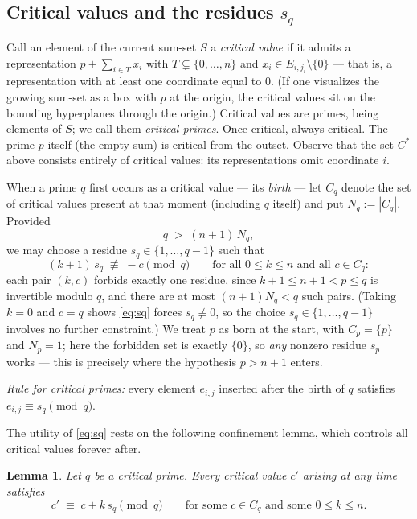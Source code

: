 \documentclass[11pt]{amsart}
\newtheorem{lemma}[theorem]{Lemma}
\theoremstyle{remark}
\begin{document}
\subsection*{Critical values and the residues $s_q$}

Call an element of the current sum-set $S$ a \emph{critical value} if
it admits a representation $p+\sum_{i\in T}x_i$ with
$T\subsetneq\{0,\dots,n\}$ and $x_i\in E_{i,j_i}\setminus\{0\}$ ---
that is, a representation with at least one coordinate equal to $0$.
(If one visualizes the growing sum-set as a box with $p$ at the
origin, the critical values sit on the bounding hyperplanes through
the origin.)  Critical values are primes, being elements of $S$; we
call them \emph{critical primes}.  Once critical, always critical.
The prime $p$ itself (the empty sum) is critical from the outset.
Observe that the set $C^\ast$ above consists entirely of critical
values: its representations omit coordinate $i$.

When a prime $q$ first occurs as a critical value --- its
\emph{birth} --- let $C_q$ denote the set of critical values present
at that moment (including $q$ itself) and put $N_q:=|C_q|$.  Provided
\begin{equation}\label{eq:room}
q \;>\; (n+1)\,N_q ,
\end{equation}
we may choose a residue $s_q\in\{1,\dots,q-1\}$ such that
\begin{equation}\label{eq:sq}
(k+1)\,s_q \;\not\equiv\; -c \pmod q
\qquad\text{for all } 0\le k\le n \text{ and all } c\in C_q :
\end{equation}
each pair $(k,c)$ forbids exactly one residue, since
$k+1\le n+1<p\le q$ is invertible modulo $q$, and there are at most
$(n+1)N_q<q$ such pairs.  (Taking $k=0$ and $c=q$ shows
\eqref{eq:sq} forces $s_q\not\equiv 0$, so the choice
$s_q\in\{1,\dots,q-1\}$ involves no further constraint.)  We treat $p$
as born at the start, with $C_p=\{p\}$ and $N_p=1$; here the forbidden
set is exactly $\{0\}$, so \emph{any} nonzero residue $s_p$ works ---
this is precisely where the hypothesis $p>n+1$ enters.

\emph{Rule for critical primes:} every element $e_{i,j}$ inserted
after the birth of $q$ satisfies $e_{i,j}\equiv s_q \pmod q$.

The utility of \eqref{eq:sq} rests on the following confinement
lemma, which controls all critical values forever after.

\begin{lemma}\label{lem:confine}
Let $q$ be a critical prime.  Every critical value $c'$ arising at any
time satisfies
\[
c' \;\equiv\; c + k\,s_q \pmod q
\qquad\text{for some } c\in C_q \text{ and some } 0\le k\le n .
\]
\end{lemma}
\end{document}
